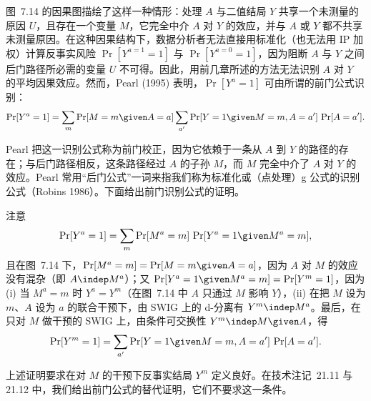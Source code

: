 \begin{techpoint}[前门准则]
图~7.14 的因果图描绘了这样一种情形：处理 $A$ 与二值结局 $Y$ 共享一个未测量的原因 $U$，且存在一个变量 $M$，它完全中介 $A$ 对 $Y$ 的效应，并与 $A$ 或 $Y$ 都不共享未测量原因。在这种因果结构下，数据分析者无法直接用标准化（也无法用 IP 加权）计算反事实风险 $\Pr[Y^{a=1}=1]$ 与 $\Pr[Y^{a=0}=1]$，因为阻断 $A$ 与 $Y$ 之间后门路径所必需的变量 $U$ 不可得。因此，用前几章所述的方法无法识别 $A$ 对 $Y$ 的平均因果效应。然而，Pearl (1995) 表明，$\Pr[Y^{a}=1]$ 可由所谓的前门公式识别：
\[
\Pr[Y^{a}=1]=\sum_m \Pr[M=m\given A=a]\sum_{a'}\Pr[Y=1\given M=m,A=a']\,\Pr[A=a'].
\]

Pearl 把这一识别公式称为前门校正，因为它依赖于一条从 $A$ 到 $Y$ 的路径的存在；与后门路径相反，这条路径经过 $A$ 的子孙 $M$，而 $M$ 完全中介了 $A$ 对 $Y$ 的效应。Pearl 常用“后门公式”一词来指我们称为标准化或（点处理）g 公式的识别公式（Robins 1986）。下面给出前门识别公式的证明。

注意
\[
\Pr[Y^{a}=1]=\sum_m \Pr[M^{a}=m]\,\Pr[Y^{a}=1\given M^{a}=m],
\]
且在图~7.14 下，$\Pr[M^{a}=m]=\Pr[M=m\given A=a]$，因为 $A$ 对 $M$ 的效应没有混杂（即 $A\indep M^{a}$）；又 $\Pr[Y^{a}=1\given M^{a}=m]=\Pr[Y^{m}=1]$，因为 (i) 当 $M^{a}=m$ 时 $Y^{a}=Y^{m}$（在图~7.14 中 $A$ 只通过 $M$ 影响 $Y$），(ii) 在把 $M$ 设为 $m$、$A$ 设为 $a$ 的联合干预下，由 SWIG 上的 d-分离有 $Y^{m}\indep M^{a}$。最后，在只对 $M$ 做干预的 SWIG 上，由条件可交换性 $Y^{m}\indep M\given A$，得
\[
\Pr[Y^{m}=1]=\sum_{a'}\Pr[Y=1\given M=m,A=a']\,\Pr[A=a'].
\]

上述证明要求在对 $M$ 的干预下反事实结局 $Y^{m}$ 定义良好。在技术注记~21.11 与 21.12 中，我们给出前门公式的替代证明，它们不要求这一条件。
\end{techpoint}
